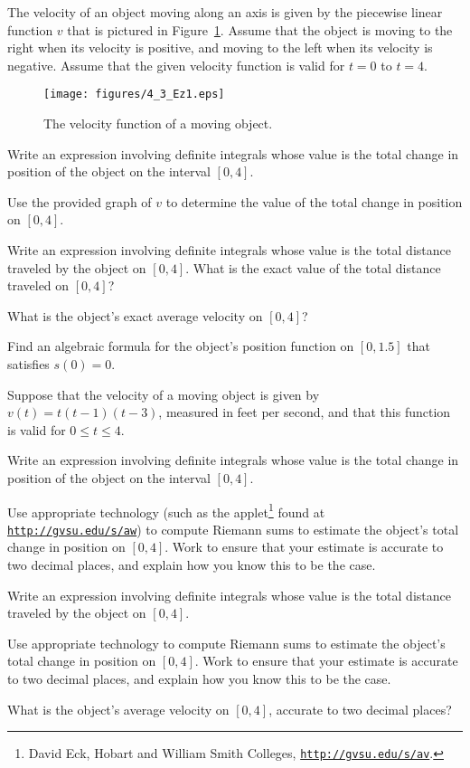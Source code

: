 \begin{exercises} 
  \item The velocity of an object moving along an axis is given by the piecewise linear function $v$ that is pictured in 
  Figure~\ref{F:4.3.Ez1}.  Assume that the object is moving to the right when its velocity is positive, and moving to the left when its velocity is negative.  Assume that the given velocity function is valid for $t = 0$ to $t = 4$.
\begin{figure}[h]
\begin{center}
\texttt{[image: figures/4\_3\_Ez1.eps]}
\caption{The velocity function of a moving object.} \label{F:4.3.Ez1}
\end{center}
\end{figure} 
	\ba
		\item Write an expression involving definite integrals whose value is the total change in position of the object on the interval $[0,4]$.
		\item Use the provided graph of $v$ to determine the value of the total change in position on $[0,4]$.
		\item Write an expression involving definite integrals whose value is the total distance traveled by the object on $[0,4]$.  What is the exact value of the total distance traveled on $[0,4]$?
		\item What is the object's exact average velocity on $[0,4]$?
		\item Find an algebraic formula for the object's position function on $[0, 1.5]$ that satisfies $s(0) = 0$.
	\ea
	
  \item Suppose that the velocity of a moving object is given by $v(t) = t(t-1)(t-3)$, measured in feet per second, and that this function is valid for $0 \le t \le 4$.
  	\ba
		\item Write an expression involving definite integrals whose value is the total change in position of the object on the interval $[0,4]$.
		\item Use appropriate technology (such as the applet\footnote{David Eck, Hobart and William Smith Colleges, \href{http://gvsu.edu/s/av}{\texttt{http://gvsu.edu/s/av}}.} found at \href{http://gvsu.edu/s/aw}{\texttt{http://gvsu.edu/s/aw}}) to compute Riemann sums to estimate the object's total change in position on $[0,4]$.  Work to ensure that your estimate is accurate to two decimal places, and explain how you know this to be the case.
		\item Write an expression involving definite integrals whose value is the total distance traveled by the object on $[0,4]$.
		\item Use appropriate technology to compute Riemann sums to estimate the object's total change in position on $[0,4]$.  Work to ensure that your estimate is accurate to two decimal places, and explain how you know this to be the case.
		\item What is the object's average velocity on $[0,4]$, accurate to two decimal places?
	\ea
	

\end{exercises}
